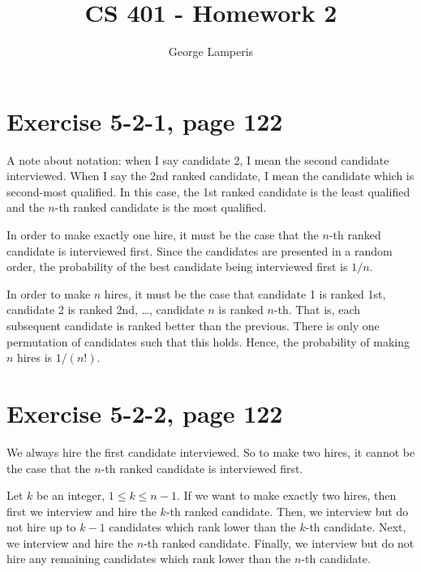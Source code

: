 \documentclass[letterpaper, 12pt, oneside]{memoir}
\title{CS 401 - Homework 2}
\author{George Lamperis}
\date{}
\begin{document}
\maketitle

\section*{Exercise 5-2-1, page 122}
A note about notation: when I say candidate 2, I mean the second candidate
interviewed. When I say the 2nd ranked candidate, I mean the candidate which is
second-most qualified. In this case, the 1st ranked candidate is the least 
qualified and the $n$-th ranked candidate is the most qualified. 


In order to make exactly one hire, it must be the case that the $n$-th ranked
candidate is interviewed first. Since the candidates are presented in a random
order, the probability of the best candidate being interviewed first is $1/n$.

In order to make $n$ hires, it must be the case that candidate 1 is ranked 1st,
candidate 2 is ranked 2nd, \ldots, candidate $n$ is ranked $n$-th. That is,
each subsequent candidate is ranked better than the previous. There is only one 
permutation of candidates such that this holds. Hence, the probability of making
$n$ hires is $1/(n!)$.


\section*{Exercise 5-2-2, page 122}
We always hire the first candidate interviewed. So to make two hires, it cannot
be the case that the $n$-th ranked candidate is interviewed first.

Let $k$ be an integer, $1 \leq k \leq n-1$. If we want to make exactly two
hires, then first we interview and hire the $k$-th ranked candidate. Then, we
interview but do not hire up to $k-1$ candidates which rank lower than
the $k$-th candidate. Next, we interview and hire the $n$-th ranked candidate. Finally,
we interview but do not hire any remaining candidates which rank lower than the
$n$-th candidate.
\end{document}
